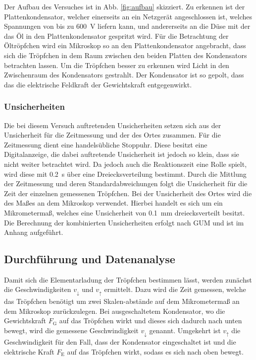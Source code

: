 Der Aufbau des Versuches ist in Abb. \ref{fig:aufbau} skizziert. 
Zu erkennen ist der Plattenkondensator, welcher einerseits an ein Netzgerät angeschlossen ist, welches Spannungen von bis zu \SI{600}{\volt} liefern kann, und andererseits an die Düse mit der das Öl in den Plattenkondensator gespritzt wird.
Für die Betrachtung der Öltröpfchen wird ein Mikroskop so an den Plattenkondensator angebracht, dass sich die Tröpfchen in dem Raum zwischen den beiden Platten des Kondensators betrachten lassen. 
Um die Tröpfchen besser zu erkennen wird Licht in den Zwischenraum des Kondensators gestrahlt.
Der Kondensator ist so gepolt, dass das die elektrische Feldkraft der Gewichtskraft entgegenwirkt.

\subsubsection{Unsicherheiten} %

Die bei diesem Versuch auftretenden Unsicherheiten setzen sich aus der Unsicherheit für die Zeitmessung und der des Ortes zusammen.
Für die Zeitmessung dient eine handelsübliche Stoppuhr.
Diese besitzt eine Digitalanzeige, die dabei auftretende Unsicherheit ist jedoch so klein, dass sie nicht weiter betrachtet wird.
Da jedoch auch die Reaktionszeit eine Rolle spielt, wird diese mit \SI{0,2}{\second} über eine Dreiecksverteilung bestimmt.
Durch die Mittlung der Zeitmessung und deren Standardabweichungen folgt die Unsicherheit für die Zeit der einzelnen gemessenen Tröpfchen.
Bei der Unsicherheit des Ortes wird die des Maßes an dem Mikroskop verwendet.
Hierbei handelt es sich um ein Mikrometermaß, welches eine Unsicherheit von \SI{0,1}{\milli\meter} dreiecksverteilt besitzt.
Die Berechnung der kombinierten Unsicherheiten erfolgt nach GUM und ist im Anhang aufgeführt.

\subsection{Durchführung und Datenanalyse}

Damit sich die Elementarladung der Tröpfchen bestimmen lässt, werden zunächst die Geschwindigkeiten $v_{\downarrow}$ und $v_{\uparrow}$ ermittelt.
Dazu wird die Zeit gemessen, welche das Tröpfchen benötigt um zwei Skalen-abstände auf dem Mikrometermaß an dem Mikroskop zurückzulegen.
Bei ausgeschaltetem Kondensator, wo die Gewichtskraft $F_\text{G}$ auf das Tröpfchen wirkt und dieses sich dadurch nach unten bewegt, wird die gemessene Geschwindigkeit $v_{\downarrow}$ genannt.
Umgekehrt ist $v_{\uparrow}$ die Geschwindigkeit für den Fall, dass der Kondensator eingeschaltet ist und die elektrische Kraft $F_\text{E}$ auf das Tröpfchen wirkt, sodass es sich nach oben bewegt. 

